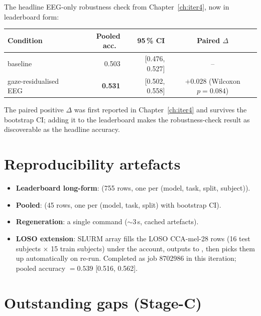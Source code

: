 The headline EEG-only robustness check from Chapter~\ref{ch:iter4}, now
in leaderboard form:

\begin{table}[ht]
\centering
\begin{tabular}{lrrc}
\toprule
Condition & Pooled acc.\ & 95\,\% CI & Paired $\Delta$ \\
\midrule
baseline               & 0.503 & [0.476, 0.527] & -- \\
gaze-residualised EEG  & \textbf{0.531} & [0.502, 0.558] & $+0.028$ (Wilcoxon $p=0.084$) \\
\bottomrule
\end{tabular}
\end{table}

The paired positive $\Delta$ was first reported in Chapter~\ref{ch:iter4}
and survives the bootstrap CI; adding it to the leaderboard makes the
robustness-check result as discoverable as the headline accuracy.

\section{Reproducibility artefacts}

\begin{itemize}
  \item \textbf{Leaderboard long-form}: 
        (755 rows, one per (model, task, split, subject)).
  \item \textbf{Pooled}: 
        (45 rows, one per (model, task, split) with bootstrap CI).
  \item \textbf{Regeneration}: a single command
        ($\sim 3$\,s, cached artefacts).
  \item \textbf{LOSO extension}: SLURM array
         fills the LOSO CCA-mel-28 rows (16 test
        subjects × 15 train subjects) under the  account,
        outputs to ,
        then  picks them up
        automatically on re-run. Completed as job 8702986 in this
        iteration; pooled accuracy $= 0.539$ [0.516, 0.562].
\end{itemize}

\section{Outstanding gaps (Stage-C)}

